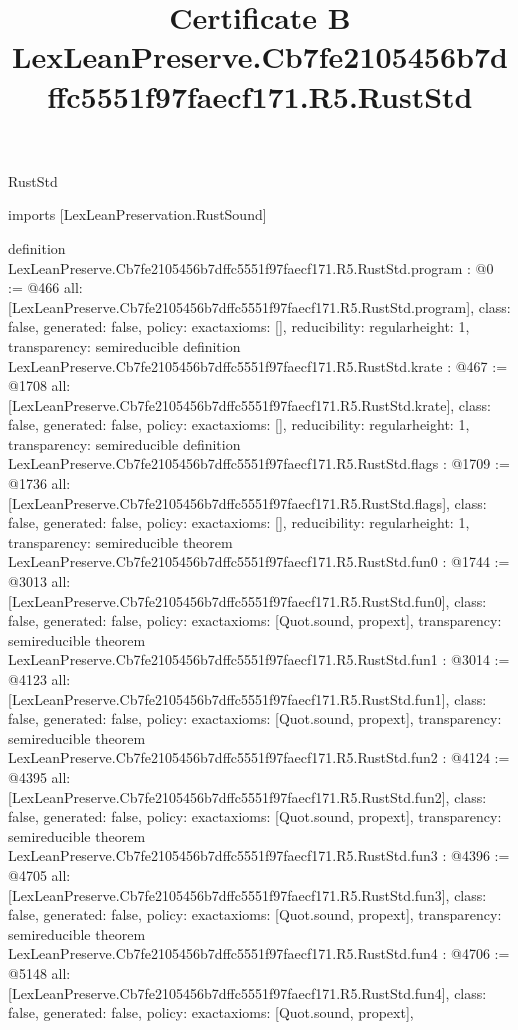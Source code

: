 \begin{lexlean}{RustStd}
\title{Certificate B LexLeanPreserve.Cb7fe2105456b7dffc5551f97faecf171.R5.RustStd}
\begin{coremodule}
imports [LexLeanPreservation.RustSound]

definition LexLeanPreserve.Cb7fe2105456b7dffc5551f97faecf171.R5.RustStd.program : @0 := @466 {
  all: [LexLeanPreserve.Cb7fe2105456b7dffc5551f97faecf171.R5.RustStd.program],
  class: false,
  generated: false,
  policy: exact{axioms: []},
  reducibility: regular{height: 1},
  transparency: semireducible
}
definition LexLeanPreserve.Cb7fe2105456b7dffc5551f97faecf171.R5.RustStd.krate : @467 := @1708 {
  all: [LexLeanPreserve.Cb7fe2105456b7dffc5551f97faecf171.R5.RustStd.krate],
  class: false,
  generated: false,
  policy: exact{axioms: []},
  reducibility: regular{height: 1},
  transparency: semireducible
}
definition LexLeanPreserve.Cb7fe2105456b7dffc5551f97faecf171.R5.RustStd.flags : @1709 := @1736 {
  all: [LexLeanPreserve.Cb7fe2105456b7dffc5551f97faecf171.R5.RustStd.flags],
  class: false,
  generated: false,
  policy: exact{axioms: []},
  reducibility: regular{height: 1},
  transparency: semireducible
}
theorem LexLeanPreserve.Cb7fe2105456b7dffc5551f97faecf171.R5.RustStd.fun0 : @1744 := @3013 {
  all: [LexLeanPreserve.Cb7fe2105456b7dffc5551f97faecf171.R5.RustStd.fun0],
  class: false,
  generated: false,
  policy: exact{axioms: [Quot.sound, propext]},
  transparency: semireducible
}
theorem LexLeanPreserve.Cb7fe2105456b7dffc5551f97faecf171.R5.RustStd.fun1 : @3014 := @4123 {
  all: [LexLeanPreserve.Cb7fe2105456b7dffc5551f97faecf171.R5.RustStd.fun1],
  class: false,
  generated: false,
  policy: exact{axioms: [Quot.sound, propext]},
  transparency: semireducible
}
theorem LexLeanPreserve.Cb7fe2105456b7dffc5551f97faecf171.R5.RustStd.fun2 : @4124 := @4395 {
  all: [LexLeanPreserve.Cb7fe2105456b7dffc5551f97faecf171.R5.RustStd.fun2],
  class: false,
  generated: false,
  policy: exact{axioms: [Quot.sound, propext]},
  transparency: semireducible
}
theorem LexLeanPreserve.Cb7fe2105456b7dffc5551f97faecf171.R5.RustStd.fun3 : @4396 := @4705 {
  all: [LexLeanPreserve.Cb7fe2105456b7dffc5551f97faecf171.R5.RustStd.fun3],
  class: false,
  generated: false,
  policy: exact{axioms: [Quot.sound, propext]},
  transparency: semireducible
}
theorem LexLeanPreserve.Cb7fe2105456b7dffc5551f97faecf171.R5.RustStd.fun4 : @4706 := @5148 {
  all: [LexLeanPreserve.Cb7fe2105456b7dffc5551f97faecf171.R5.RustStd.fun4],
  class: false,
  generated: false,
  policy: exact{axioms: [Quot.sound, propext]},
}
\end{coremodule}
\end{lexlean}
